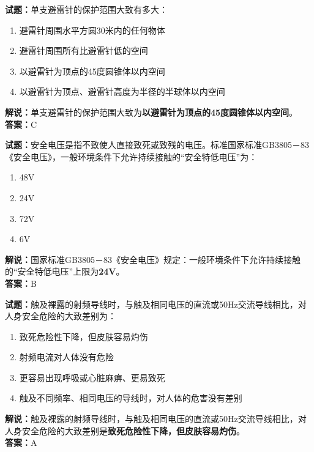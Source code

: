 \documentclass{ctexbook}
\begin{document}
\bigskip



\noindent\textbf{试题：}单支避雷针的保护范围大致有多大：
\begin{enumerate}[leftmargin=3em]
	\item 避雷针周围水平方圆30米内的任何物体
	\item 避雷针周围所有比避雷针低的空间
	\item 以避雷针为顶点的45度圆锥体以内空间
	\item 以避雷针为顶点、避雷针高度为半径的半球体以内空间
\end{enumerate}
\noindent\textbf{解说：}单支避雷针的保护范围大致为\textbf{以避雷针为顶点的45度圆锥体以内空间}。\\\noindent\textbf{答案：}C


\bigskip



\noindent\textbf{试题：}安全电压是指不致使人直接致死或致残的电压。标准国家标准GB3805－83《安全电压》，一般环境条件下允许持续接触的“安全特低电压”为：
\begin{enumerate}[leftmargin=3em]
	\item 48V
	\item 24V
	\item 72V
	\item 6V
\end{enumerate}
\noindent\textbf{解说：}国家标准GB3805－83《安全电压》规定：一般环境条件下允许持续接触的“安全特低电压”上限为\textbf{24V}。\\\noindent\textbf{答案：}B



\bigskip



\noindent\textbf{试题：}触及裸露的射频导线时，与触及相同电压的直流或50Hz交流导线相比，对人身安全危险的大致差别为：
\begin{enumerate}[leftmargin=3em]
	\item 致死危险性下降，但皮肤容易灼伤
	\item 射频电流对人体没有危险
	\item 更容易出现呼吸或心脏麻痹、更易致死
	\item 触及不同频率、相同电压的导线时，对人体的危害没有差别
\end{enumerate}
\noindent\textbf{解说：}触及裸露的射频导线时，与触及相同电压的直流或50Hz交流导线相比，对人身安全危险的大致差别是\textbf{致死危险性下降，但皮肤容易灼伤}。\\\noindent\textbf{答案：}A
\end{document}
